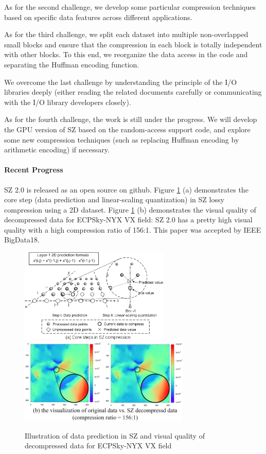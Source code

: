 As for the second challenge, we develop some particular compression techniques based on specific data features across different applications.

As for the third challenge, we split each dataset into multiple non-overlapped small blocks and ensure that the compression in each block is totally independent with other blocks. To this end, we reorganize the data access in the code and separating the Huffman encoding function. 

We overcome the last challenge by understanding the principle of the I/O libraries deeply (either reading the related documents carefully or communicating with the I/O library developers closely).

As for the fourth challenge, the work is still under the progress. We will develop the GPU version of SZ based on the random-access support code, and explore some new compression techniques (such as replacing Huffman encoding by arithmetic encoding) if necessary.  

\paragraph{Recent Progress}

SZ 2.0 is released as an open source on github. Figure \ref{fig:sz-principle} (a) demonstrates the core step (data prediction and linear-scaling quantization) in SZ lossy compression using a 2D dataset. Figure \ref{fig:sz-principle} (b) demonstrates the visual quality of decompressed data for ECPSky-NYX VX field: SZ 2.0 has a pretty high visual quality with a high compression ratio of 156:1. This paper was accepted by IEEE BigData18.

\begin{figure}[htb]
\centering
\includegraphics[width=2.8in]{projects/2.3.4-DataViz/2.3.4.14-VeloC-SZ/sz-illu.png}
\includegraphics[width=3.2in]{projects/2.3.4-DataViz/2.3.4.14-VeloC-SZ/Visual-quality-NYX-SZ.png}
\vspace{-2mm}
	\caption{\label{fig:sz-principle}Illustration of data prediction in SZ and visual quality of decompressed data for ECPSky-NYX VX field}
\end{figure}

